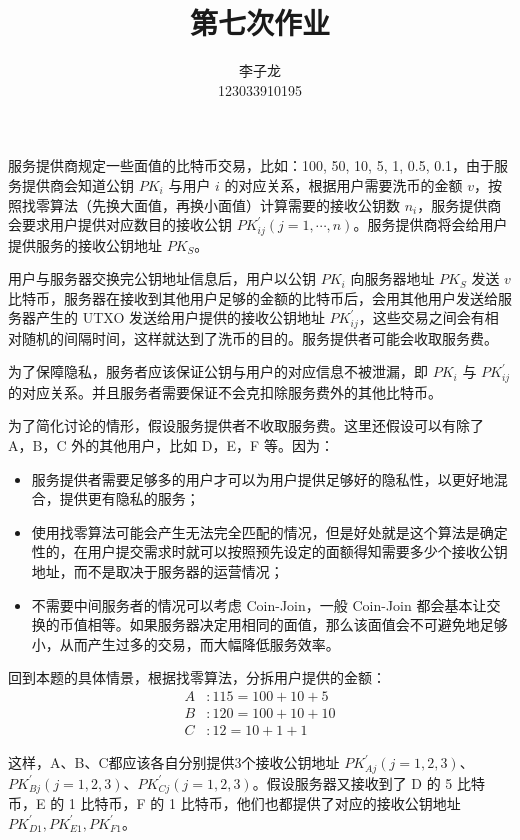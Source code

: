 \documentclass{sjtuarticle}
\title{第七次作业}
\author{李子龙\\123033910195}
\def\pk#1{\mathit{PK}_{#1}}
\def\pki#1#2{\mathit{PK}_{#1#2}^\prime}
\begin{document}
\maketitle

服务提供商规定一些面值的比特币交易，比如：100, 50, 10, 5, 1, 0.5, 0.1，由于服务提供商会知道公钥 $\mathit{PK}_i$ 与用户 $i$ 的对应关系，根据用户需要洗币的金额 $v$，按照找零算法（先换大面值，再换小面值）计算需要的接收公钥数 $n_i$，服务提供商会要求用户提供对应数目的接收公钥 $\mathit{PK}_{ij}^\prime (j=1,\cdots,n)$。服务提供商将会给用户提供服务的接收公钥地址 $\mathit{PK}_S$。

用户与服务器交换完公钥地址信息后，用户以公钥 $\mathit{PK}_i$ 向服务器地址 $\mathit{PK}_S$ 发送 $v$ 比特币，服务器在接收到其他用户足够的金额的比特币后，会用其他用户发送给服务器产生的 UTXO 发送给用户提供的接收公钥地址 $\mathit{PK}_{ij}^\prime$，这些交易之间会有相对随机的间隔时间，这样就达到了洗币的目的。服务提供者可能会收取服务费。

为了保障隐私，服务者应该保证公钥与用户的对应信息不被泄漏，即 $\pk{i}$ 与 $\pki{i}{j}$ 的对应关系。并且服务者需要保证不会克扣除服务费外的其他比特币。

为了简化讨论的情形，假设服务提供者不收取服务费。这里还假设可以有除了 A，B，C 外的其他用户，比如 D，E，F 等。因为：
\begin{itemize}
    \item 服务提供者需要足够多的用户才可以为用户提供足够好的隐私性，以更好地混合，提供更有隐私的服务；
    \item 使用找零算法可能会产生无法完全匹配的情况，但是好处就是这个算法是确定性的，在用户提交需求时就可以按照预先设定的面额得知需要多少个接收公钥地址，而不是取决于服务器的运营情况；
    \item 不需要中间服务者的情况可以考虑 Coin-Join，一般 Coin-Join 都会基本让交换的币值相等。如果服务器决定用相同的面值，那么该面值会不可避免地足够小，从而产生过多的交易，而大幅降低服务效率。
\end{itemize}

回到本题的具体情景，根据找零算法，分拆用户提供的金额：
\begin{align*}
    A&: 115 = 100 + 10 + 5 \\
    B&: 120 = 100 + 10 + 10 \\
    C&: 12 = 10 + 1 + 1
\end{align*}

这样，A、B、C都应该各自分别提供3个接收公钥地址 $\mathit{PK}_{Aj}^\prime (j=1,2,3)$、$\mathit{PK}_{Bj}^\prime (j=1,2,3)$、$\mathit{PK}_{Cj}^\prime (j=1,2,3)$。假设服务器又接收到了 D 的 5 比特币，E 的 1 比特币，F 的 1 比特币，他们也都提供了对应的接收公钥地址 $\mathit{PK}_{D1}^\prime, \mathit{PK}_{E1}^\prime, \mathit{PK}_{F1}^\prime$。
\end{document}
